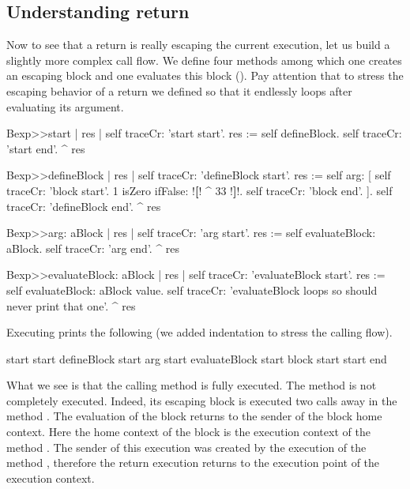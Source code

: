 \documentclass[a4paper,10pt,twoside]{book}
\begin{document}
\subsection{Understanding return}
Now to see that a return is really escaping the current execution, let us build a slightly more complex call flow. We define four methods among which one creates an escaping block  and one evaluates this block (). Pay attention that to stress the escaping behavior of a return we defined  so that it endlessly loops after evaluating its argument.

\begin{code}{}
Bexp>>start
	| res |
	self traceCr: 'start start'.
	res := self defineBlock.
	self traceCr: 'start end'.
	^ res

Bexp>>defineBlock
	| res |
	self traceCr: 'defineBlock start'.
	res := self arg: [ self traceCr: 'block start'.
                            1 isZero ifFalse: !\textbf{[}! ^ 33 !\textbf{]}!.
                            self traceCr: 'block end'. ].
	self traceCr: 'defineBlock end'.
	^ res

Bexp>>arg: aBlock
	| res |
	self traceCr: 'arg start'.
	res := self evaluateBlock: aBlock.
	self traceCr: 'arg end'.
	^ res

Bexp>>evaluateBlock: aBlock
	| res |
	self traceCr: 'evaluateBlock start'.
	res := self evaluateBlock: aBlock value.
	self traceCr: 'evaluateBlock loops so should never print that one'.
	^  res
\end{code}


Executing   prints the following (we added indentation to stress the calling flow).

\begin{code}{}
start start
   defineBlock start
      arg start
         evaluateBlock start
            block start
start end
\end{code}

What we see is that the calling method  is fully executed. The method  is not completely executed. Indeed, its escaping block \ct{[^33]} is executed two calls away in the method . The evaluation of the block returns to the sender of the block home context. Here the home context of the block is the execution context of the method . The sender of this execution was created by the execution of the method , therefore the return execution returns to the execution point of the  execution context.
\end{document}
